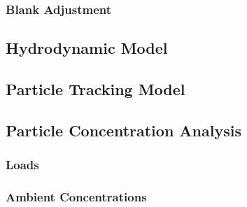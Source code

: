 \documentclass[draft]{jgr/agujournal2019}
\begin{document}
\subsubsection{Blank Adjustment}


\subsection{Hydrodynamic Model}

\subsection{Particle Tracking Model}

\subsection{Particle Concentration Analysis}

\subsubsection{Loads}

\subsubsection{Ambient Concentrations}






%
%
%
%
%
%
%
%
%
%
\end{document}
